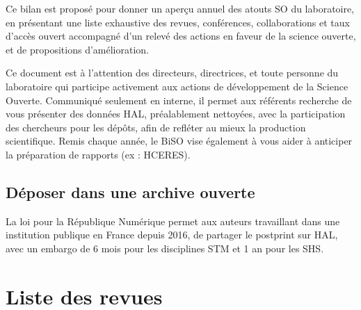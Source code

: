 \documentclass[french, 11pt]{dibiso/biso}
\begin{document}
Ce bilan est proposé pour donner un aperçu annuel des atouts SO du laboratoire, en présentant une liste exhaustive des revues, conférences, collaborations et taux d'accès ouvert accompagné d'un relevé des actions en faveur de la science ouverte, et de propositions d'amélioration.

Ce document est à l'attention des directeurs, directrices, et toute personne du laboratoire qui participe activement aux actions de développement de la Science Ouverte. Communiqué seulement en interne, il permet aux référents recherche de vous présenter des données HAL, préalablement nettoyées, avec la participation des chercheurs pour les dépôts, afin de refléter au mieux la production scientifique. Remis chaque année, le BiSO vise également à vous aider à anticiper la préparation de rapports (ex : HCERES).


\subsection*{Déposer dans une archive ouverte}

La loi pour la République Numérique permet aux auteurs travaillant dans une institution publique en France depuis 2016, de partager le postprint sur HAL, avec un embargo de 6 mois pour les disciplines STM et 1 an pour les SHS.

\pagebreak

\section{Liste des revues}
\end{document}
